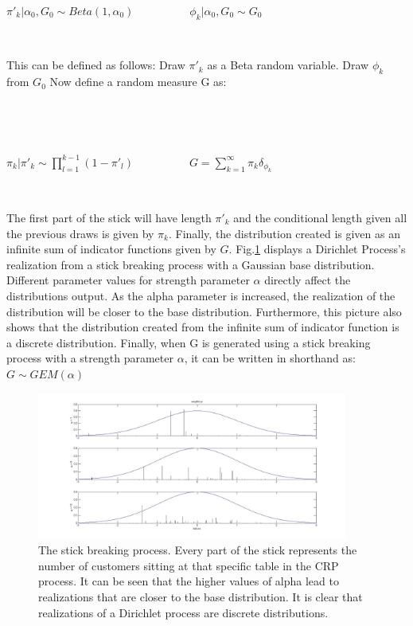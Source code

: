\documentclass[twoside,hidelinks]{article}
\begin{document}
\centerline{ $\pi'_k  | \alpha_0, G_0 \sim Beta(1, \alpha_0)$\ \ \ \ \ \ \ \ \ \ $  \phi_k | \alpha_0, G_0 \sim G_0 $} 

\ \ 

This can be defined as follows: Draw $\pi'_k$ as a Beta random variable. Draw $\phi_k$ from $G_0$ Now define a random measure G as:

\ \

\ \
\centerline{ $\pi_k  | \pi'_k \sim \prod_{l=1}^{k-1}(1- \pi'_l   )$\ \ \ \ \ \ \ \ \ \   $  G = \sum_{k=1}^\infty \pi_k \delta_{\phi_k} $}
\ \

The first part of the stick will have length $\pi'_k$ and the conditional length given all the previous draws is given by $\pi_k$. Finally, the distribution created is given as an infinite sum of indicator functions given by $G$. Fig.\ref{crpGausBase} displays a Dirichlet Process's realization from a stick breaking process with a Gaussian base distribution. Different parameter values for strength parameter $\alpha$ directly affect the distributions output. As the alpha parameter is increased, the realization of the distribution will be closer to the base distribution. Furthermore, this picture also shows that the distribution created from the infinite sum of indicator function is a discrete distribution. Finally, when G is generated using a stick breaking process with a strength parameter $\alpha$, it can be written in shorthand as: $ G \sim GEM(\alpha) $

\begin{figure}[h!]
          \centerline{\includegraphics[width=0.91\textwidth]{stickBreakGaus}}
	\caption{The stick breaking process. Every part of the stick represents the number of customers sitting at that specific table in the CRP process. It can be seen that the higher values of alpha lead to realizations that are closer to the base distribution. It is clear that realizations of a Dirichlet process are discrete distributions.}
	\label{crpGausBase}
\end{figure}
\end{document}
